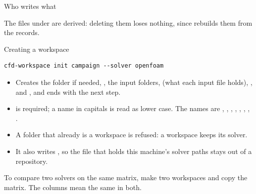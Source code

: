 \begin{frame}{Who writes what}
\vspace{2mm}
\begin{takeaway}The files under  are derived: deleting them loses
nothing, since  rebuilds them from the records.\end{takeaway}
\end{frame}

\begin{frame}[fragile]{Creating a workspace}
\begin{lstlisting}
cfd-workspace init campaign --solver openfoam
\end{lstlisting}
\begin{itemize}
  \item Creates the folder if needed, , the input folders,
         (what each input file holds),
        ,  and , and ends with the next
        step.
  \item {} is required; a name in capitals is read as lower
        case. The names are , ,
        , , , ,
        , .
  \item A folder that already is a workspace is refused: a workspace keeps
        its solver.
  \item It also writes , so the file that holds this
        machine's solver paths stays out of a repository.
\end{itemize}
\begin{cfdbpitfall}
To compare two solvers on the same matrix, make two workspaces and copy the
matrix. The columns mean the same in both.
\end{cfdbpitfall}
\end{frame}

